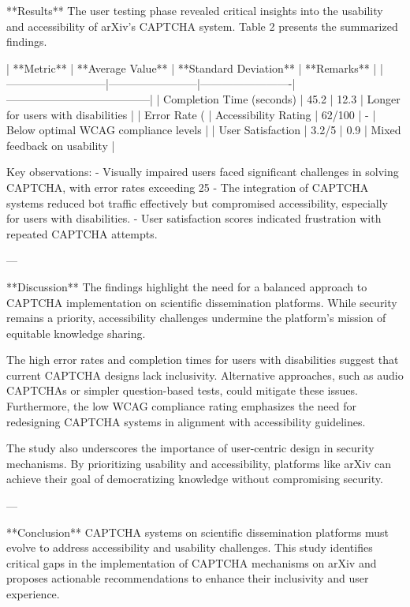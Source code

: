 **Results**  
The user testing phase revealed critical insights into the usability and accessibility of arXiv's CAPTCHA system. Table 2 presents the summarized findings.

| **Metric**               | **Average Value**      | **Standard Deviation** | **Remarks**                          |
|---------------------------|------------------------|-------------------------|---------------------------------------|
| Completion Time (seconds) | 45.2                  | 12.3                    | Longer for users with disabilities    |
| Error Rate (%
| Accessibility Rating      | 62/100                | -                       | Below optimal WCAG compliance levels  |
| User Satisfaction         | 3.2/5                | 0.9                     | Mixed feedback on usability           |

Key observations:  
- Visually impaired users faced significant challenges in solving CAPTCHA, with error rates exceeding 25%
- The integration of CAPTCHA systems reduced bot traffic effectively but compromised accessibility, especially for users with disabilities.  
- User satisfaction scores indicated frustration with repeated CAPTCHA attempts.

---

**Discussion**  
The findings highlight the need for a balanced approach to CAPTCHA implementation on scientific dissemination platforms. While security remains a priority, accessibility challenges undermine the platform's mission of equitable knowledge sharing.

The high error rates and completion times for users with disabilities suggest that current CAPTCHA designs lack inclusivity. Alternative approaches, such as audio CAPTCHAs or simpler question-based tests, could mitigate these issues. Furthermore, the low WCAG compliance rating emphasizes the need for redesigning CAPTCHA systems in alignment with accessibility guidelines.

The study also underscores the importance of user-centric design in security mechanisms. By prioritizing usability and accessibility, platforms like arXiv can achieve their goal of democratizing knowledge without compromising security.

---

**Conclusion**  
CAPTCHA systems on scientific dissemination platforms must evolve to address accessibility and usability challenges. This study identifies critical gaps in the implementation of CAPTCHA mechanisms on arXiv and proposes actionable recommendations to enhance their inclusivity and user experience.

